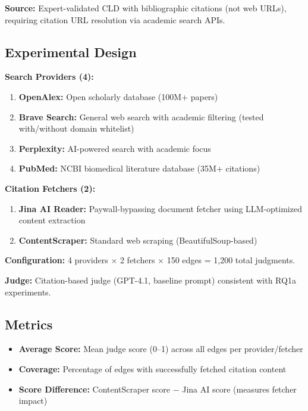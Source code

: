 \textbf{Source:} Expert-validated CLD with bibliographic citations (not web URLs), requiring citation URL resolution via academic search APIs.

\subsection{Experimental Design}

\textbf{Search Providers (4):}
\begin{enumerate}[noitemsep]
    \item \textbf{OpenAlex:} Open scholarly database (100M+ papers)
    \item \textbf{Brave Search:} General web search with academic filtering (tested with/without domain whitelist)
    \item \textbf{Perplexity:} AI-powered search with academic focus
    \item \textbf{PubMed:} NCBI biomedical literature database (35M+ citations)
\end{enumerate}

\textbf{Citation Fetchers (2):}
\begin{enumerate}[noitemsep]
    \item \textbf{Jina AI Reader:} Paywall-bypassing document fetcher using LLM-optimized content extraction
    \item \textbf{ContentScraper:} Standard web scraping (BeautifulSoup-based)
\end{enumerate}

\textbf{Configuration:} 4 providers $\times$ 2 fetchers $\times$ 150 edges = 1,200 total judgments.

\textbf{Judge:} Citation-based judge (GPT-4.1, baseline prompt) consistent with RQ1a experiments.

\subsection{Metrics}

\begin{itemize}[noitemsep]
    \item \textbf{Average Score:} Mean judge score (0--1) across all edges per provider/fetcher
    \item \textbf{Coverage:} Percentage of edges with successfully fetched citation content
    \item \textbf{Score Difference:} ContentScraper score $-$ Jina AI score (measures fetcher impact)
\end{itemize}

